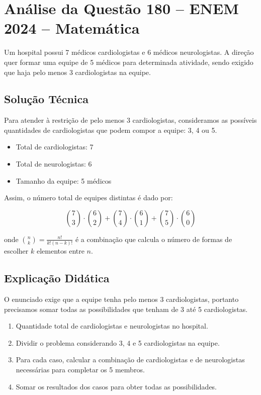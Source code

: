 \documentclass{article}
\begin{document}
\section*{Análise da Questão 180 -- ENEM 2024 -- Matemática}

Um hospital possui 7 médicos cardiologistas e 6 médicos neurologistas. A direção quer formar uma equipe de 5 médicos para determinada atividade, sendo exigido que haja pelo menos 3 cardiologistas na equipe.

\subsection*{Solução Técnica}
Para atender à restrição de pelo menos 3 cardiologistas, consideramos as possíveis quantidades de cardiologistas que podem compor a equipe: 3, 4 ou 5.

\begin{itemize}
  \item Total de cardiologistas: 7
  \item Total de neurologistas: 6
  \item Tamanho da equipe: 5 médicos
\end{itemize}

Assim, o número total de equipes distintas é dado por:

\[
\binom{7}{3} \cdot \binom{6}{2} + \binom{7}{4} \cdot \binom{6}{1} + \binom{7}{5} \cdot \binom{6}{0}
\]

onde \(\binom{n}{k} = \frac{n!}{k!(n-k)!}\) é a combinação que calcula o número de formas de escolher \(k\) elementos entre \(n\).

\subsection*{Explicação Didática}
O enunciado exige que a equipe tenha pelo menos 3 cardiologistas, portanto precisamos somar todas as possibilidades que tenham de 3 até 5 cardiologistas.

\begin{enumerate}
  \item Quantidade total de cardiologistas e neurologistas no hospital.
  \item Dividir o problema considerando 3, 4 e 5 cardiologistas na equipe.
  \item Para cada caso, calcular a combinação de cardiologistas e de neurologistas necessárias para completar os 5 membros.
  \item Somar os resultados dos casos para obter todas as possibilidades.
\end{enumerate}
\end{document}
